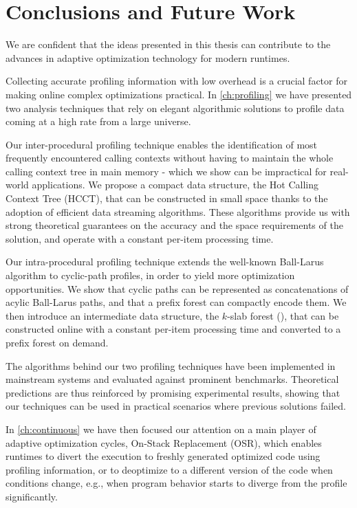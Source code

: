 \chapter{Conclusions and Future Work}
\label{ch:conclusions}

We are confident that the ideas presented in this thesis can contribute to the advances in adaptive optimization technology for modern runtimes.

Collecting accurate profiling information with low overhead is a crucial factor for making online complex optimizations practical. In \mychapter\ref{ch:profiling} we have presented two analysis techniques that rely on elegant algorithmic solutions to profile data coming at a high rate from a large universe.

Our inter-procedural profiling technique enables the identification of most frequently encountered calling contexts without having to maintain the whole calling context tree in main memory - which we show can be impractical for real-world applications. We propose a compact data structure, the Hot Calling Context Tree (HCCT), that can be constructed in small space thanks to the adoption of efficient data streaming algorithms. These algorithms provide us with strong theoretical guarantees on the accuracy and the space requirements of the solution, and operate with a constant per-item processing time.

Our intra-procedural profiling technique extends the well-known Ball-Larus algorithm to cyclic-path profiles, in order to yield more optimization opportunities. We show that cyclic paths can be represented as concatenations of acylic Ball-Larus paths, and that a prefix forest can compactly encode them. We then introduce an intermediate data structure, the $k$-slab forest (\ksf), that can be constructed online with a constant per-item processing time and converted to a prefix forest on demand.

The algorithms behind our two profiling techniques have been implemented in mainstream systems and evaluated against prominent benchmarks. Theoretical predictions are thus reinforced by promising experimental results, showing that our techniques can be used in practical scenarios where previous solutions failed.

In \mychapter\ref{ch:continuous} we have then focused our attention on a main player of adaptive optimization cycles, On-Stack Replacement (OSR), which enables runtimes to divert the execution to freshly generated optimized code using profiling information, or to deoptimize to a different version of the code when conditions change, e.g., when program behavior starts to diverge from the profile significantly.


